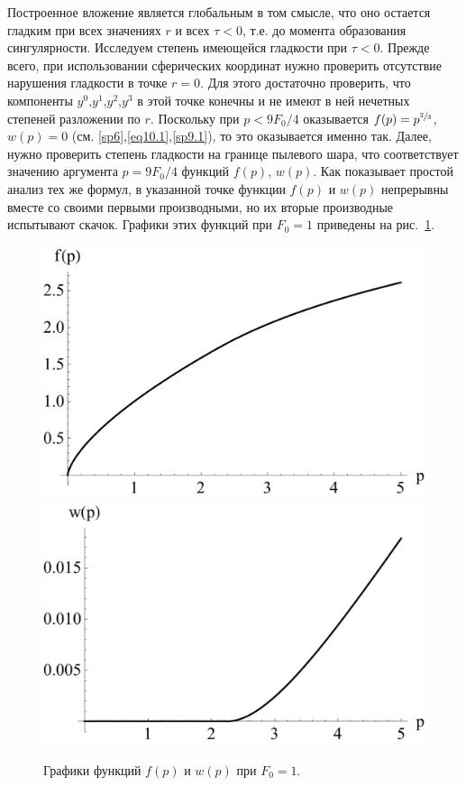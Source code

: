 \documentclass[12pt]{article}
\begin{document}
Построенное вложение является глобальным в том смысле, что оно остается гладким при всех значениях $r$
и всех $\tau<0$, т.е. до момента образования сингулярности.
Исследуем степень имеющейся гладкости при $\tau<0$.
Прежде всего, при использовании сферических координат нужно проверить отсутствие нарушения гладкости
в точке $r=0$. Для этого достаточно проверить, что компоненты $y^0$,$y^1$,$y^2$,$y^3$ в этой точке конечны и не имеют в ней
нечетных степеней разложении по $r$. Поскольку при $p<9F_0/4$ оказывается $f(p)=p^{\sfrac{2}{3}}$, $w(p)=0$
(см. \eqref{sp6},\eqref{eq10.1},\eqref{sp9.1}), то это оказывается именно так.
Далее, нужно проверить степень гладкости на границе пылевого шара, что соответствует значению аргумента $p=9F_0/4$
функций $f(p)$, $w(p)$.
Как показывает простой анализ тех же формул, в указанной точке функции $f(p)$ и $w(p)$ непрерывны вместе со своими первыми производными,
но их вторые производные испытывают скачок. Графики этих функций при $F_0=1$ приведены на рис.~\ref{graf-f-w}.
\begin{figure}[h!]
\centering
\includegraphics[width=0.45\linewidth]{graf_f.pdf}
\includegraphics[width=0.45\linewidth]{graf_w.pdf}
\caption{\label{graf-f-w}
Графики функций $f(p)$ и $w(p)$ при $F_0=1$.
}
\end{figure}
\end{document}
